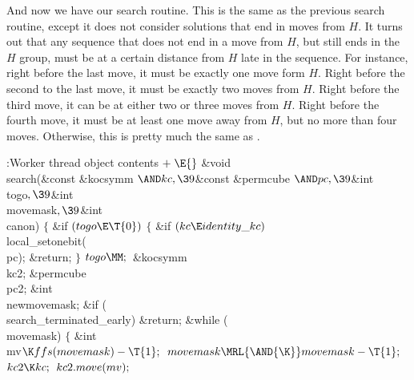 And now we have our search routine.  This is the same as the
previous search routine, except it does not consider solutions
that end in moves from $H$.  It turns out that any sequence
that does not end in a move from $H$, but still ends in the
$H$ group, must be at a certain distance from $H$ late in the
sequence.  For instance, right before the last move, it must be
exactly one move form $H$.  Right before the second to the last
move, it must be exactly two moves from $H$.  Right before
the third move, it can be at either two or three moves from $H$.
Right before the fourth move, it must be at least one move away
from $H$, but no more than four moves.  Otherwise, this is
pretty much the same as .

\Y\B\4:Worker thread object contents\X${}\mathrel+\E{}$\6
\&{void} \\{search}(\&{const} \&{kocsymm} ${}{\AND}\\{kc},\39{}$\&{const} %
\&{permcube} ${}{\AND}\\{pc},\39{}$\&{int} \\{togo}${},\39{}$\&{int} %
\\{movemask}${},\39{}$\&{int} \\{canon})\1\1\2\2\6
${}\{{}$\1\6
\&{if} ${}(\\{togo}\E\T{0}){}$\5
${}\{{}$\1\6
\&{if} ${}(\\{kc}\E\\{identity\_kc}){}$\1\5
\\{local\_setonebit}(\\{pc});\2\6
\&{return};\6
\4${}\}{}$\2\6
${}\\{togo}\MM;{}$\7
\&{kocsymm} \\{kc2};\6
\&{permcube} \\{pc2};\6
\&{int} \\{newmovemask};\7
\&{if} (\\{search\_terminated\_early})\1\5
\&{return};\2\6
\&{while} (\\{movemask})\5
${}\{{}$\1\6
\&{int} \\{mv}${}\K\\{ffs}(\\{movemask})-\T{1};{}$\7
${}\\{movemask}\MRL{\AND{\K}}\\{movemask}-\T{1};{}$\6
${}\\{kc2}\K\\{kc};{}$\6
${}\\{kc2}.\\{move}(\\{mv});{}$\7

